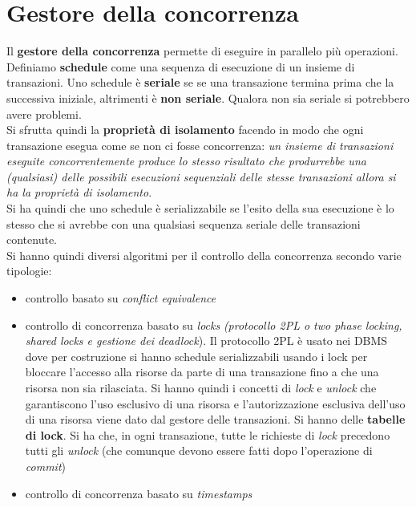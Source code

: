 \documentclass[a4paper,12pt, oneside]{book}
\begin{document}
\section{Gestore della concorrenza}
Il \textbf{gestore della concorrenza} permette di eseguire in parallelo più
operazioni.\\
Definiamo \textbf{schedule} come una sequenza di esecuzione di un insieme di
transazioni. Uno schedule è \textbf{seriale} se se una transazione  termina
prima che la successiva iniziale, altrimenti è \textbf{non seriale}. Qualora non
sia seriale si potrebbero avere problemi.\\
Si sfrutta quindi la \textbf{proprietà di isolamento} facendo in modo che ogni
transazione esegua come se non ci fosse concorrenza: \textit{un insieme di
  transazioni eseguite concorrentemente produce lo stesso risultato che
  produrrebbe una (qualsiasi) delle possibili esecuzioni sequenziali delle stesse
  transazioni allora si ha la proprietà di isolamento}.\\
Si ha quindi che uno schedule è serializzabile se l'esito della sua esecuzione è
lo stesso che si avrebbe con una qualsiasi sequenza seriale delle transazioni
contenute.\\
Si hanno quindi diversi algoritmi per il controllo della concorrenza secondo
varie tipologie:
\begin{itemize}
  \item controllo basato su \textit{conflict equivalence}
  \item controllo di concorrenza basato su \textit{locks} \textit{(protocollo
    2PL o two phase locking, shared locks e gestione dei deadlock}). Il
  protocollo 2PL è usato nei DBMS dove per costruzione si hanno schedule
  serializzabili usando i lock per  bloccare l'accesso alla risorse da parte di
  una transazione fino a che una risorsa non sia rilasciata. Si hanno quindi i
  concetti di \textit{lock} e \textit{unlock} che garantiscono l'uso esclusivo
  di una risorsa e l'autorizzazione esclusiva dell'uso di una risorsa viene dato
  dal gestore delle transazioni. Si hanno delle \textbf{tabelle di lock}. Si ha
  che, in ogni transazione, tutte le richieste di \textit{lock} precedono tutti
  gli \textit{unlock} (che comunque devono essere fatti dopo l'operazione di
  \textit{commit}) 
  \item controllo di concorrenza basato su \textit{timestamps}
\end{itemize}
\end{document}
